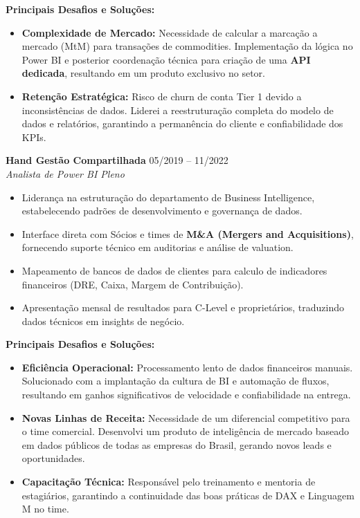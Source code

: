 \documentclass[11pt,a4paper]{article}
\begin{document}
\vspace{2mm}
\noindent \textbf{Principais Desafios e Soluções:}
\begin{itemize}[leftmargin=*, noitemsep]
    \item \textbf{Complexidade de Mercado:} Necessidade de calcular a marcação a mercado (MtM) para transações de commodities. Implementação da lógica no Power BI e posterior coordenação técnica para criação de uma \textbf{API dedicada}, resultando em um produto exclusivo no setor.
    \item \textbf{Retenção Estratégica:} Risco de churn de conta Tier 1 devido a inconsistências de dados. Liderei a reestruturação completa do modelo de dados e relatórios, garantindo a permanência do cliente e confiabilidade dos KPIs.
\end{itemize}
\vspace{2mm}

\vspace{2mm}

\noindent \textbf{Hand Gestão Compartilhada} \hfill 05/2019 -- 11/2022 \\
\textit{Analista de Power BI Pleno}
\begin{itemize}[leftmargin=*, noitemsep]
    \item Liderança na estruturação do departamento de Business Intelligence, estabelecendo padrões de desenvolvimento e governança de dados.
    \item Interface direta com Sócios e times de \textbf{M\&A (Mergers and Acquisitions)}, fornecendo suporte técnico em auditorias e análise de valuation.
    \item Mapeamento de bancos de dados de clientes para calculo de indicadores financeiros (DRE, Caixa, Margem de Contribuição).
    \item Apresentação mensal de resultados para C-Level e proprietários, traduzindo dados técnicos em insights de negócio.
\end{itemize}

\vspace{2mm}
\noindent \textbf{Principais Desafios e Soluções:}
\begin{itemize}[leftmargin=*, noitemsep]
    \item \textbf{Eficiência Operacional:} Processamento lento de dados financeiros manuais. Solucionado com a implantação da cultura de BI e automação de fluxos, resultando em ganhos significativos de velocidade e confiabilidade na entrega.
    \item \textbf{Novas Linhas de Receita:} Necessidade de um diferencial competitivo para o time comercial. Desenvolvi um produto de inteligência de mercado baseado em dados públicos de todas as empresas do Brasil, gerando novos leads e oportunidades.
    \item \textbf{Capacitação Técnica:} Responsável pelo treinamento e mentoria de estagiários, garantindo a continuidade das boas práticas de DAX e Linguagem M no time.
\end{itemize}
\vspace{2mm}
\end{document}
